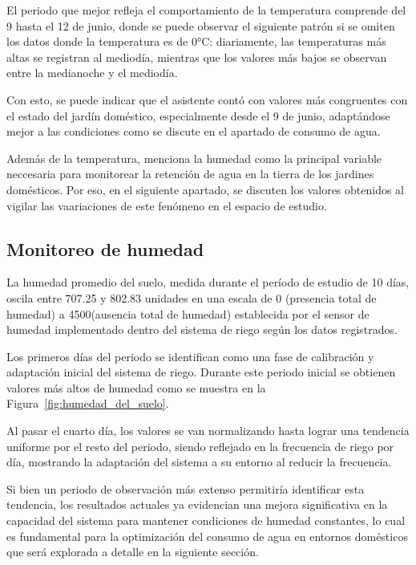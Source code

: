 \documentclass[pdflatex,sn-mathphys-num]{sn-jnl}%
\theoremstyle{thmstyleone}%
\theoremstyle{thmstyletwo}%
\theoremstyle{thmstylethree}%
\begin{document}
\begin{multicols}{2}
\justifying
El periodo que mejor refleja el comportamiento de la temperatura comprende del 9 hasta el 12 de junio, donde se puede observar el siguiente patrón si se omiten los datos donde la temperatura es de 0°C: diariamente, las temperaturas más altas se registran al mediodía, mientras que los valores más bajos se observan entre la medianoche y el mediodía. 

Con esto, se puede indicar que el asistente contó con valores más congruentes con el estado del jardín doméstico, especialmente desde el 9 de junio, adaptándose mejor a las condiciones como se discute en el apartado de consumo de agua.

Además de la temperatura, \cite{ref12} menciona la humedad como la principal variable neccesaria para monitorear la retención de agua en la tierra de los jardines domésticos. Por eso, en el siguiente apartado, se discuten los valores obtenidos al vigilar las vaariaciones de este fenómeno en el espacio de estudio.
\subsection*{Monitoreo de humedad}

La humedad promedio del suelo, medida durante el período de estudio de 10 días, oscila entre 707.25 y 802.83 unidades en una escala de 0 (presencia total de humedad) a 4500(ausencia total de humedad) establecida por el sensor de humedad implementado dentro del sistema de riego según los datos registrados.

Los primeros días del periodo se identifican como una fase de calibración y adaptación inicial del sistema de riego. Durante este periodo inicial se obtienen valores más altos de humedad como se muestra en la Figura~\ref{fig:humedad_del_suelo}.

Al pasar el cuarto día, los valores se van normalizando hasta lograr una tendencia uniforme por el resto del periodo, siendo reflejado en la frecuencia de riego por día, mostrando la adaptación del sistema a su entorno al reducir la frecuencia.  

Si bien un periodo de observación más extenso permitiría identificar esta tendencia, los resultados actuales ya evidencian una mejora significativa en la capacidad del sistema para mantener condiciones de humedad constantes, lo cual es fundamental para la optimización del consumo de agua en entornos domésticos que será explorada a detalle en la siguiente sección.
\end{multicols}
\end{document}

